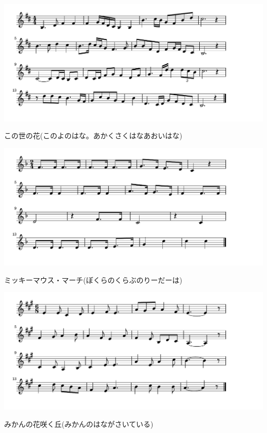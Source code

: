 \documentclass[a4paper]{ltjsarticle}
\begin{document}
\includegraphics[clip]{konoyonohana_crop.pdf}

\vspace{-10mm} \hspace{10mm}
この世の花(このよのはな。あかくさくはなあおいはな)



\includegraphics[clip]{mickeymousemarch_crop.pdf}

\vspace{-10mm} \hspace{10mm}
ミッキーマウス・マーチ(ぼくらのくらぶのりーだーは)


\includegraphics[clip]{mikan_crop.pdf}

\vspace{-10mm} \hspace{10mm}
みかんの花咲く丘(みかんのはながさいている)
\end{document}
